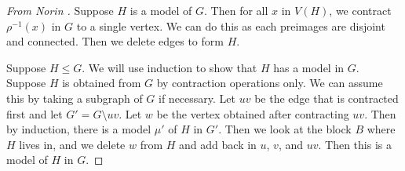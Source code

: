 \begin{proof}[From Norin \cite{norinMath599GraphMinors2017}]
	Suppose \(H\) is a model of \(G\). Then for all \(x\) in \(V(H)\), we contract \(\rho^{-1}(x)\) in \(G\) to a single vertex. We can do this as each preimages are disjoint and connected. Then we delete edges to form \(H\).

	Suppose \(H \leq G\). We will use induction to show that \(H\) has a model in \(G\). Suppose \(H\) is obtained from \(G\) by contraction operations only. We can assume this by taking a subgraph of \(G\) if necessary. Let \(uv\) be the edge that is contracted first and let \(G' = G \setminus uv\). Let \(w\) be the vertex obtained after contracting \(uv\). Then by induction, there is a model \(\mu'\) of \(H\) in \(G'\). Then we look at the block \(B\) where \(H\) lives in, and we delete \(w\) from \(H\) and add back in \(u\), \(v\), and \(uv\). Then this is a model of \(H\) in \(G\).
\end{proof}
